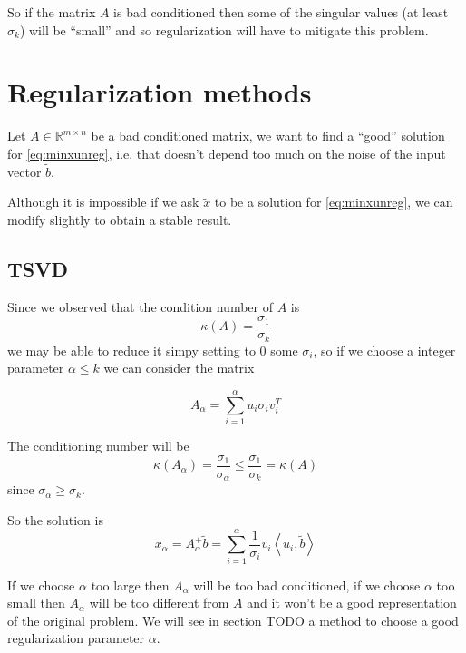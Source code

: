 \documentclass[a4paper,10pt]{article}
\theoremstyle{plain}
\theoremstyle{definition}
\theoremstyle{remark}
\newcommand{\ang}[1]{\left<#1\right>}
\begin{document}
So if the matrix $A$ is bad conditioned then some of the singular
values (at least $\sigma _k$) will be ``small'' and so regularization
will have to mitigate this problem.

\section{Regularization methods}
\label{sec:regularizationmethods}

Let $A\in \mathbb{R}^{m \times n}$ be a bad conditioned matrix, we
want to find a ``good'' solution for \ref{eq:minxunreg}, i.e. that
doesn't depend too much on the noise of the input vector $\tilde b$.

Although it is impossible if we ask $\tilde x$ to be a solution for
\ref{eq:minxunreg}, we can modify slightly to obtain a stable result.

\subsection{TSVD}
\label{sec:TSVD}

Since we observed that the condition number of $A$ is
\[ \kappa (A) = \frac{\sigma _1}{\sigma _k} \]
we may be able to reduce it simpy setting to $0$ some $\sigma _i$, so
if we choose a integer parameter $\alpha \le k$ we can consider the matrix

\begin{equation}
  \label{eq:TSVDmatrix}
  A_\alpha = \sum _{i=1} ^\alpha u_i \sigma _i v_i ^T
\end{equation}

The conditioning number will be
\[ \kappa (A_\alpha) = \frac{\sigma _1}{\sigma _\alpha} \le  \frac{\sigma
  _1}{\sigma _k} = \kappa(A) \]
since $\sigma _\alpha \ge \sigma _k$.

So the solution is
\begin{equation}
  \label{eq:TSVDsolution}
  x_\alpha = A_\alpha ^+ \tilde b = \sum _{i=1} ^\alpha \frac{1}{\sigma _i}
  v_i \ang{u_i,\tilde b}
\end{equation}

If we choose $\alpha$ too large then $A_\alpha$ will be too bad
conditioned, if we choose $\alpha$ too small then $A_\alpha$ will be
too different from $A$ and it won't be a good representation of the
original problem. We will see in section TODO a method to choose a
good regularization parameter $\alpha$.














\newpage


\end{document}
